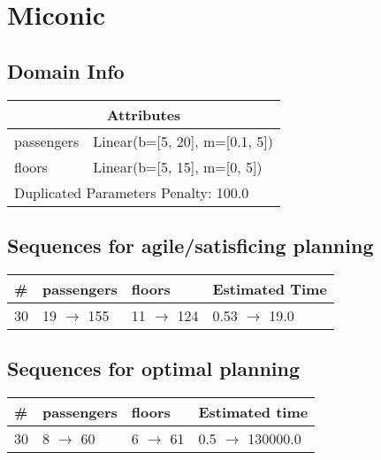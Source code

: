 \documentclass{article}
\begin{document}
                            \newpage \section{Miconic}
                    \subsection*{Domain Info}

                    \begin{center}
                    \begin{tabular}{@{}p{}p{}@{}}
                    \multicolumn{2}{c}{\bf \large Attributes}\\\midrule
                    passengers & Linear(b=[5, 20], m=[0.1, 5])\\
floors & Linear(b=[5, 15], m=[0, 5])
                    
                     \\\midrule
                    \multicolumn{2}{l}{Duplicated Parameters Penalty: 100.0}
                    \end{tabular}
                    \end{center}
                
                         \subsection*{Sequences for agile/satisficing planning}

                        \begin{center}
                        \begin{tabular}{@{}l|l|l|l@{}}
                        \# & passengers & floors & Estimated Time\\\midrule
                        30&19 $\rightarrow$ 155&11 $\rightarrow$ 124&0.53 $\rightarrow$ 19.0
                        \end{tabular}
                        \end{center}
                    
                            \subsection*{Sequences for optimal planning}

                            \begin{center}
                            \begin{tabular}{@{}l|l|l|l@{}}
                            \# & passengers & floors & Estimated time\\\midrule
                            30&8 $\rightarrow$ 60&6 $\rightarrow$ 61&0.5 $\rightarrow$ 130000.0
                            \end{tabular}
                            \end{center}
                    
\end{document}

